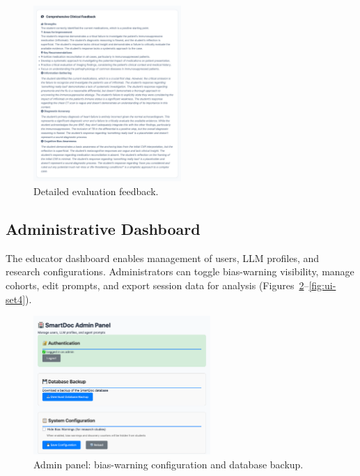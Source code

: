 \begin{figure}[h]
  \centering
  \includegraphics[width=0.50\textwidth]{figures/ui/ui_detailed.png}
  \caption{Detailed evaluation feedback.}
  \label{fig:ui-detailed}
\end{figure}

\newpage

\subsection{Administrative Dashboard}

The educator dashboard enables management of users, LLM profiles, and research
configurations. Administrators can toggle bias-warning visibility, manage
cohorts, edit prompts, and export session data for analysis
(Figures~\ref{fig:ui-set1}–\ref{fig:ui-set4}).

\begin{figure}[h]
  \centering
  \includegraphics[width=0.6\textwidth]{figures/ui/ui_set1.png}
  \caption{Admin panel: bias-warning configuration and database backup.}
  \label{fig:ui-set1}
\end{figure}

